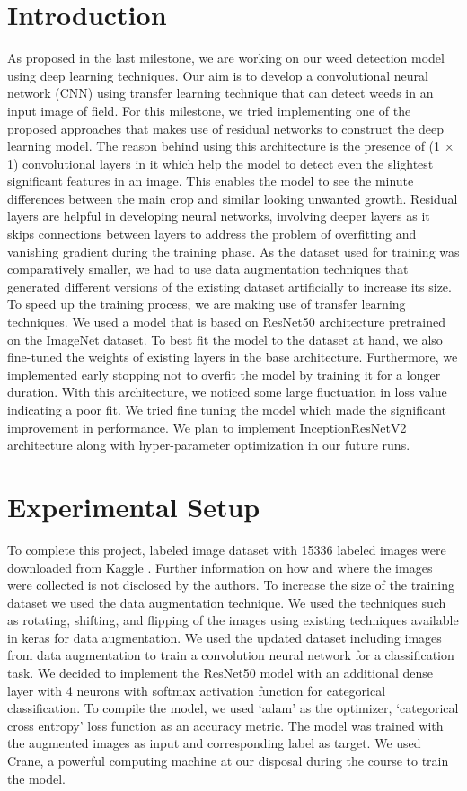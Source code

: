 \documentclass{report}
\begin{document}
\section{Introduction}
As proposed in the last milestone, we are working on our weed detection model using deep learning techniques. Our aim is to develop a convolutional neural network (CNN) using transfer learning technique that can detect weeds in an input image of field. For this milestone, we tried implementing one of the proposed approaches that makes use of residual networks to construct the deep learning model. The reason behind using this architecture is the presence of (1 × 1) convolutional layers in it which help the model to detect even the slightest significant features in an image. This enables the model to see the minute differences between the main crop and similar looking unwanted growth. Residual layers are helpful in developing neural networks, involving deeper layers as it skips connections between layers to address the problem of overfitting and vanishing gradient during the training phase. As the dataset used for training was comparatively smaller, we had to use data augmentation techniques that generated different versions of the existing dataset artificially to increase its size. To speed up the training process, we are making use of transfer learning techniques. We used a model that is based on ResNet50 architecture pretrained on the ImageNet dataset.  To best fit the model to the dataset at hand, we also fine-tuned the weights of existing layers in the base architecture. Furthermore, we implemented early stopping not to overfit the model by training it for a longer duration. With this architecture, we noticed some large fluctuation in loss value indicating a poor fit. We tried fine tuning the model which made the significant improvement in performance. We plan to implement InceptionResNetV2 architecture along with hyper-parameter optimization in our future runs.  
\label{sec:M3-intro}


\section{Experimental Setup}
To complete this project, labeled image dataset with 15336 labeled images were downloaded from Kaggle \cite{kaggle}. Further information on how and where the images were collected is not disclosed by the authors. To increase the size of the training dataset we used the data augmentation technique. We used the techniques such as rotating, shifting, and flipping of the images using existing techniques available in keras for data augmentation. We used the updated dataset including images from data augmentation to train a convolution neural network for a classification task. We decided to implement the ResNet50 model with an additional dense layer with 4 neurons with softmax activation function for categorical classification. To compile the model, we used ‘adam’ as the optimizer, ‘categorical cross entropy’ loss function as an accuracy metric. The model was trained with the augmented images as input and corresponding label as target. We used Crane, a powerful computing machine at our disposal during the course to train the model.
\end{document}
